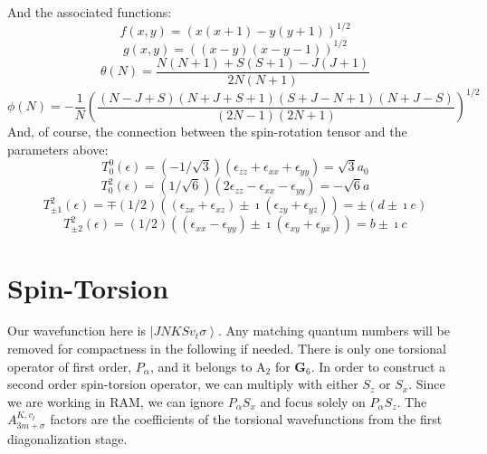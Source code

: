 \documentclass{article}
\begin{document}
And the associated functions:
\begin{equation}
f(x,y) = (x(x+1)-y(y+1))^{1/2}
\end{equation}
\begin{equation}
g(x,y) = ((x-y)(x-y-1))^{1/2}
\end{equation}
\begin{equation}
\theta(N) = \frac{N(N+1)+S(S+1)-J(J+1)}{2N(N+1)}
\end{equation}
\begin{equation}
\phi(N) =  -\frac{1}{N}\left( \frac{(N-J+S)(N+J+S+1)(S+J-N+1)(N+J-S)}{(2N-1)(2N+1)}\right)^{1/2}
\end{equation}
And, of course, the connection between the spin-rotation tensor and the parameters above:
\begin{equation}
T_{0}^{0}(\epsilon) = (-1/\sqrt{3})(\epsilon_{zz}+\epsilon_{xx}+\epsilon_{yy})=\sqrt{3}a_{0}
\end{equation}
\begin{equation}
T_{0}^{2}(\epsilon) = (1/\sqrt{6})(2\epsilon_{zz}-\epsilon_{xx}-\epsilon_{yy})=-\sqrt{6}a
\end{equation}
\begin{equation}
T_{\pm1}^{2}(\epsilon) = \mp(1/2)((\epsilon_{zx}+\epsilon_{xz})\pm\imath(\epsilon_{zy}+\epsilon_{yz})) = \pm(d\pm\imath e)
\end{equation}
\begin{equation}
T_{\pm2}^{2}(\epsilon) = (1/2)((\epsilon_{xx}-\epsilon_{yy})\pm\imath(\epsilon_{xy}+\epsilon_{yx})) = b \pm\imath c
\end{equation}

\section{Spin-Torsion}
Our wavefunction here is $\left|J N K S v_{t} \sigma\right\rangle$. Any matching quantum numbers will be removed for compactness in the following if needed. There is only one torsional operator of first order, $P_{\alpha}$, and it belongs to A$_{2}$ for \textbf{G}$_{6}$. In order to construct a second order spin-torsion operator, we can multiply with either $S_{z}$ or $S_{x}$. Since we are working in RAM, we can ignore $P_{\alpha}S_{x}$ and focus solely on $P_{\alpha}S_{z}$. The $A^{K,v_{t}}_{3m+\sigma}$ factors are the coefficients of the torsional wavefunctions from the first diagonalization stage.
\end{document}
